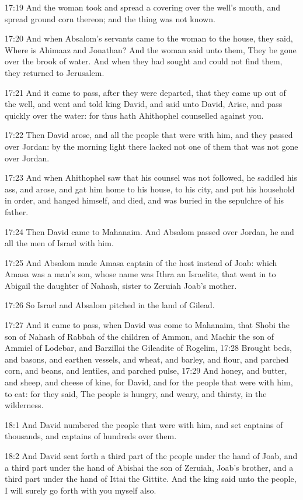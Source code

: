 17:19 And the woman took and spread a covering over the well's mouth, and spread ground corn thereon; and the thing was not known.

17:20 And when Absalom's servants came to the woman to the house, they said, Where is Ahimaaz and Jonathan? And the woman said unto them, They be gone over the brook of water. And when they had sought and could not find them, they returned to Jerusalem.

17:21 And it came to pass, after they were departed, that they came up out of the well, and went and told king David, and said unto David, Arise, and pass quickly over the water: for thus hath Ahithophel counselled against you.

17:22 Then David arose, and all the people that were with him, and they passed over Jordan: by the morning light there lacked not one of them that was not gone over Jordan.

17:23 And when Ahithophel saw that his counsel was not followed, he saddled his ass, and arose, and gat him home to his house, to his city, and put his household in order, and hanged himself, and died, and was buried in the sepulchre of his father.

17:24 Then David came to Mahanaim. And Absalom passed over Jordan, he and all the men of Israel with him.

17:25 And Absalom made Amasa captain of the host instead of Joab: which Amasa was a man's son, whose name was Ithra an Israelite, that went in to Abigail the daughter of Nahash, sister to Zeruiah Joab's mother.

17:26 So Israel and Absalom pitched in the land of Gilead.

17:27 And it came to pass, when David was come to Mahanaim, that Shobi the son of Nahash of Rabbah of the children of Ammon, and Machir the son of Ammiel of Lodebar, and Barzillai the Gileadite of Rogelim, 17:28 Brought beds, and basons, and earthen vessels, and wheat, and barley, and flour, and parched corn, and beans, and lentiles, and parched pulse, 17:29 And honey, and butter, and sheep, and cheese of kine, for David, and for the people that were with him, to eat: for they said, The people is hungry, and weary, and thirsty, in the wilderness.

18:1 And David numbered the people that were with him, and set captains of thousands, and captains of hundreds over them.

18:2 And David sent forth a third part of the people under the hand of Joab, and a third part under the hand of Abishai the son of Zeruiah, Joab's brother, and a third part under the hand of Ittai the Gittite.  And the king said unto the people, I will surely go forth with you myself also.

